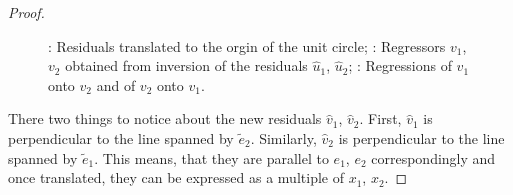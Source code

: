 \begin{proof}
\begin{figure}[ht!]
\begin{center}
\caption{: Residuals translated to the orgin of the unit circle;
: Regressors $v_1$, $v_2$ obtained from inversion of the residuals $\hat{u}_1$, $\hat{u}_2$;
: Regressions of $v_1$ onto $v_2$ and of $v_2$ onto $v_1$.}
\end{center}
\end{figure}

There two things to notice about the new residuals $\hat{v}_1$, $\hat{v}_2$.
First, $\hat{v}_1$ is perpendicular to the line spanned by $\tilde{e}_2$.
Similarly, $\hat{v}_2$ is perpendicular to the line spanned by $\tilde{e}_1$.
This means, that they are parallel to $e_1$, $e_2$ correspondingly
and once translated, they can be expressed as a multiple of $x_1$, $x_2$.


\end{proof}
